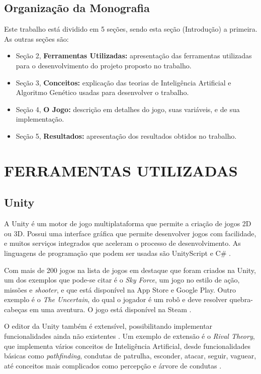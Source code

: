 \documentclass[
	12pt,					%
	openright,				%
	oneside,				%
	a4paper,				%
	bibjustif,				%
	chapter=TITLE,			%
	english,				%
	brazil,					%
	]{abntex2}
\begin{document}
	\FloatBarrier
	\section{Organização da Monografia}
		Este trabalho está dividido em 5 seções, sendo esta seção (Introdução) a primeira. As outras seções são:
		\begin{itemize}[noitemsep]
     		\item Seção 2, \textbf{Ferramentas Utilizadas:} apresentação das ferramentas utilizadas para o desenvolvimento do projeto proposto no trabalho.
     		\item Seção 3, \textbf{Conceitos:} explicação das teorias de Inteligência Artificial e Algoritmo Genético usadas para desenvolver o trabalho.
     		\item Seção 4, \textbf{O Jogo:} descrição em detalhes do jogo, suas variáveis, e de sua implementação.
     		\item Seção 5, \textbf{Resultados:} apresentação dos resultados obtidos no trabalho.
  	 	\end{itemize}

\FloatBarrier
\newpage %
\chapter{FERRAMENTAS UTILIZADAS}

	\FloatBarrier
	\section{Unity}
		A Unity é um motor de jogo multiplataforma que permite a criação de jogos 2D ou 3D.
		Possui uma interface gráfica que permite desenvolver jogos com facilidade,
		e muitos serviços integrados que aceleram o processo de desenvolvimento.
		As linguagens de programação que podem ser usadas são UnityScript e C\#
		\cite{unitySite}.
		
		Com mais de 200 jogos na lista de jogos em destaque que foram criados na Unity,
		um dos exemplos que pode-se citar é o \textit{Sky Force},
		um jogo no estilo de ação, missões e \textit{shooter},
		e que está disponível na App Store e Google Play.
		Outro exemplo é o \textit{The Uncertain},
		do qual o jogador é um robô e
		deve resolver quebra-cabeças em uma aventura.
		O jogo está disponível na Steam
		\cite{unityGames}.
		
		O editor da Unity também é extensível, possibilitando implementar funcionalidades ainda não existentes
		\cite{unitySite}.
		Um exemplo de extensão é o \textit{Rival Theory},
		que implementa vários conceitos de Inteligência Artificial,
		desde funcionalidades básicas como \textit{pathfinding},
		condutas de patrulha, esconder, atacar, seguir, vaguear,
		até conceitos mais complicados como percepção e árvore de condutas
		\cite{rivalTheory}.
		
\end{document}
